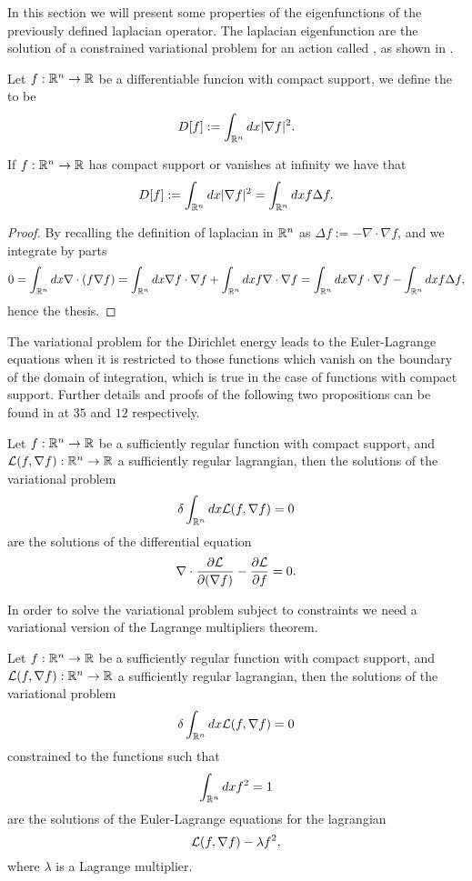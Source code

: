 \documentclass[../2.tex]{subfiles}
\begin{document}
In this section we will present some properties of the eigenfunctions of the previously defined laplacian operator.
The laplacian eigenfunction are the solution of a constrained variational problem for an action called , as shown in \cite{bronstein}.

\begin{defn}
    Let $f:\mathbb{R}^n \to \mathbb{R}$ be a differentiable funcion with compact support, we define the  to be
    \[ D[f] := \int_{\mathbb{R}^n} dx |\nabla f|^2 .\]
\end{defn}

\begin{prop}
    If $f:\mathbb{R}^n \to\mathbb{R}$ has compact support or vanishes at infinity we have that
    \[ D[f] := \int_{\mathbb{R}^n} dx |\nabla f|^2 = \int_{\mathbb{R}^n} dx f\Delta f .\]
\end{prop}
\begin{proof}
    By recalling the definition of laplacian in $\mathbb{R}^n$ as $\Delta f := -\nabla \cdot \nabla f$, and we integrate by parts
    \[ 0 = \int_{\mathbb{R}^n} dx \nabla \cdot (f \nabla f) = \int_{\mathbb{R}^n} dx \nabla f \cdot \nabla f + \int_{\mathbb{R}^n} dx f \nabla \cdot \nabla f = \int_{\mathbb{R}^n} dx \nabla f \cdot \nabla f - \int_{\mathbb{R}^n} dx f \Delta f, \]
    hence the thesis. \qedhere
\end{proof}

The variational problem for the Dirichlet energy leads to the Euler-Lagrange equations when it is restricted to those functions which
vanish on the boundary of the domain of integration, which is true in the case of functions with compact support.
Further details and proofs of the following two propositions can be found in \cite{fomin} at $35$ and $12$ respectively.

\begin{prop}
    Let $f:\mathbb{R}^n \to \mathbb{R}$ be a sufficiently regular function with compact support, and $\mathcal{L}(f,\nabla f) : \mathbb{R}^n \to \mathbb{R}$ a sufficiently regular lagrangian,
    then the solutions of the variational problem 
    \[ \delta\int_{\mathbb{R}^n} dx \mathcal{L}(f,\nabla f) = 0 \]
    are the solutions of the differential equation 
    \[ \nabla \cdot \frac{\partial \mathcal{L}}{\partial(\nabla f)} - \frac{\partial\mathcal{L}}{\partial f} = 0. \]
\end{prop}

In order to solve the variational problem subject to constraints we need a variational 
version of the Lagrange multipliers theorem.

\begin{prop}
    Let $f:\mathbb{R}^n \to \mathbb{R}$ be a sufficiently regular function with compact support, and $\mathcal{L}(f,\nabla f) : \mathbb{R}^n \to \mathbb{R}$ a sufficiently regular lagrangian,
    then the solutions of the variational problem 
    \[ \delta\int_{\mathbb{R}^n} dx \mathcal{L}(f,\nabla f) = 0 \]
    constrained to the functions such that 
    \[ \int_{\mathbb{R}^n} dx f^2 = 1 \]
    are the solutions of the Euler-Lagrange equations for the lagrangian
    \[ \mathcal{L}(f,\nabla f) - \lambda f^2, \]
    where $\lambda$ is a Lagrange multiplier.
\end{prop}
\end{document}
